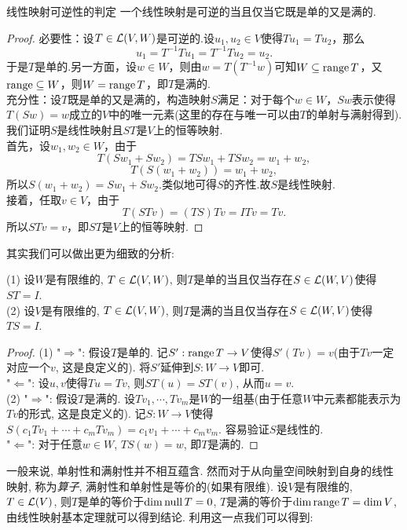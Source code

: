 \begin{proposition}{线性映射可逆性的判定}
	一个线性映射是可逆的当且仅当它既是单的又是满的.
\end{proposition}
\begin{proof}
	 必要性：设$T \in \mathcal{L} (V,W)$是可逆的.设$u_1,u_2 \in V$使得$Tu_1 = Tu_2$，那么$$u_1 = T^{-1} T u_1 = T^{-1} T u_2 = u_2.$$
	于是$T$是单的.另一方面，设$w \in W$，则由$w = T(T^{-1}w)$可知$W \subseteq \operatorname{range} T$，又$\operatorname{range} \subseteq W$，则$W = \operatorname{range} T$，即$T$是满的. \\
	 充分性：设$T$既是单的又是满的，构造映射$S$满足：对于每个$w \in W$，$Sw$表示使得$T(Sw)=w$成立的$V$中的唯一元素(这里的存在与唯一可以由$T$的单射与满射得到).我们证明$S$是线性映射且$ST$是$V$上的恒等映射. \\
	首先，设$w_1,w_2 \in W$，由于$$T(Sw_1+Sw_2)=TSw_1 + TSw_2 = w_1 + w_2,$$
	$$T(S(w_1+w_2)) = w_1+w_2,$$
	所以$S(w_1+w_2)=Sw_1 + Sw_2$.类似地可得$S$的齐性.故$S$是线性映射. \\
	接着，任取$v \in V$，由于$$T(STv) = (TS)Tv=ITv=Tv.$$
	所以$STv=v$，即$ST$是$V$上的恒等映射.
\end{proof}

其实我们可以做出更为细致的分析:

\begin{proposition}{} %
	(1) 设$W$是有限维的, $T \in \mathcal{L} (V,W)$, 则$T$是单的当且仅当存在$S \in \mathcal{L} (W,V)$使得$ST=I$. \\
	(2) 设$V$是有限维的, $T \in \mathcal{L} (V,W)$, 则$T$是满的当且仅当存在$S \in \mathcal{L} (W,V)$使得$TS=I$.
\end{proposition}
\begin{proof}
	(1) "$\Rightarrow$": 假设$T$是单的. 记$S':\operatorname{range} T \to V$使得$S'(Tv)=v$(由于$Tv$一定对应一个$v$, 这是良定义的). 将$S'$延伸到$S:W \to V$即可. \\
	"$\Leftarrow$": 设$u,v$使得$Tu=Tv$, 则$ST(u)=ST(v)$, 从而$u=v$. \\
	(2) "$\Rightarrow$": 假设$T$是满的. 设$Tv_1,\cdots ,Tv_m$是$W$的一组基(由于任意$W$中元素都能表示为$Tv$的形式, 这是良定义的). 记$S:W \to V$使得$S(c_1Tv_1+\cdots + c_mTv_m)=c_1v_1+\cdots + c_mv_m$. 容易验证$S$是线性的. \\
	"$\Leftarrow$": 对于任意$w \in W$, $TS(w)=w$, 即$T$是满的.
\end{proof}

一般来说, 单射性和满射性并不相互蕴含. 然而对于从向量空间映射到自身的线性映射, 称为\textit{算子}, 满射性和单射性是等价的(如果有限维). 设$V$是有限维的, $T \in \mathcal{L} (V)$, 则$T$是单的等价于$\dim \operatorname{null} T = 0$, $T$是满的等价于$\dim \operatorname{range} T = \dim V$, 由线性映射基本定理就可以得到结论. 利用这一点我们可以得到: 

